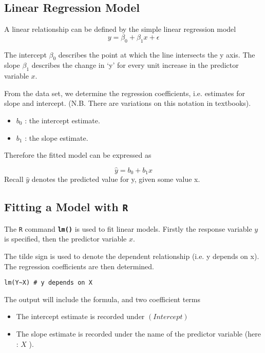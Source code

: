 \subsection{Linear Regression Model}

A linear relationship can be defined by the simple linear regression model
\[y = \beta_0 + \beta_1x + \epsilon\]

The intercept $\beta_0$ describes the point at which the line intersects the y axis.
The slope $\beta_1$ describes the change in ‘y’ for every unit increase in the predictor variable $x$.

From the data set, we determine the regression coefficients, i.e. estimates for slope and intercept. (N.B. There are variations on this notation in textbooks).

\begin{itemize}	\item $b_0$ : the intercept estimate.
\item	$b_1$ : the slope estimate.
\end{itemize}

Therefore the fitted model can be expressed as

\[ \hat{y} = b_0 + b_1x \]
Recall $\hat{y}$  denotes the predicted value for y, given some value x.

\subsection{Fitting a Model with \texttt{R}}

The  \texttt{R} command   \texttt{\textbf{lm()}} is used to fit linear models. Firstly the response variable $y$  is specified, then the predictor variable $x$.

The tilde sign is used to denote the dependent relationship (i.e. y depends on x). The regression coefficients are then determined.

\begin{framed}
\begin{verbatim}
lm(Y~X) # y depends on X
\end{verbatim}
\end{framed}

The output will include the formula, and two coefficient terms
\begin{itemize}
\item The intercept estimate is recorded under $(Intercept)$
\item The slope estimate is recorded under the name of the predictor variable (here : $X$ ).
\end{itemize}	
	
